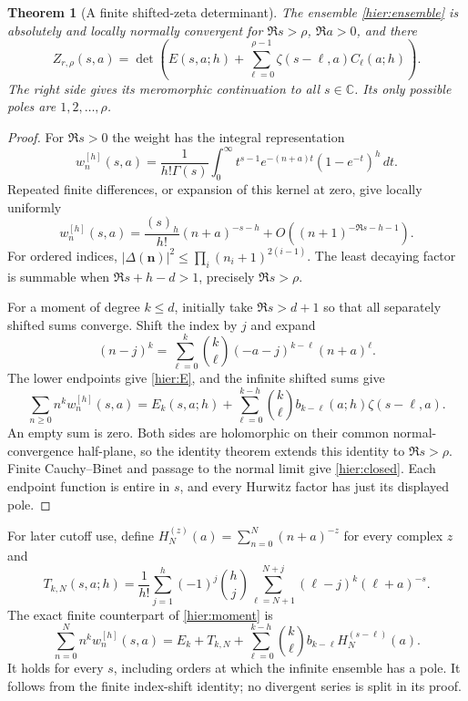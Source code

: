\documentclass[11pt]{article}
\newtheorem{theorem}{Theorem}[section]
\theoremstyle{definition}
\theoremstyle{remark}
\numberwithin{equation}{section}
\begin{document}
\begin{theorem}[A finite shifted-zeta determinant]
\label{hier:closure}
The ensemble \eqref{hier:ensemble} is absolutely and locally normally
convergent for $\Re s>\rho$, $\Re a>0$, and there
\begin{equation}\label{hier:closed}
 \boxed{\displaystyle
 Z_{r,\rho}(s,a)=\det\left(
 E(s,a;h)+\sum_{\ell=0}^{\rho-1}
                    \zeta(s-\ell,a)C_\ell(a;h)\right).}
\end{equation}
The right side gives its meromorphic continuation to all $s\in\mathbb C$.
Its only possible poles are $1,2,\ldots,\rho$.
\end{theorem}
\begin{proof}
For $\Re s>0$ the weight has the integral representation
\begin{equation}\label{hier:laplace}
 w_n^{[h]}(s,a)=\frac1{h!\Gamma(s)}
 \int_0^\infty t^{s-1}e^{-(n+a)t}(1-e^{-t})^h\,dt.
\end{equation}
Repeated finite differences, or expansion of this kernel at zero,
give locally uniformly
\begin{equation}\label{hier:decay}
 w_n^{[h]}(s,a)=\frac{(s)_h}{h!}(n+a)^{-s-h}
                     +O((n+1)^{-\Re s-h-1}).
\end{equation}
For ordered indices, $|\Delta(\boldsymbol n)|^2\le
\prod_i(n_i+1)^{2(i-1)}$.  The least decaying factor is summable
when $\Re s+h-d>1$, precisely $\Re s>\rho$.

For a moment of degree $k\le d$, initially take $\Re s>d+1$ so
that all separately shifted sums converge.  Shift the index by $j$
and expand
\[
 (n-j)^k=\sum_{\ell=0}^k\binom k\ell
                      (-a-j)^{k-\ell}(n+a)^\ell.
\]
The lower endpoints give \eqref{hier:E}, and the infinite shifted
sums give
\begin{equation}\label{hier:moment}
 \sum_{n\ge0}n^k w_n^{[h]}(s,a)
 =E_k(s,a;h)+\sum_{\ell=0}^{k-h}
     \binom k\ell b_{k-\ell}(a;h)\zeta(s-\ell,a).
\end{equation}
An empty sum is zero.  Both sides are holomorphic on their common
normal-convergence half-plane, so the identity theorem extends this
identity to $\Re s>\rho$.  Finite Cauchy--Binet and passage to the
normal limit give \eqref{hier:closed}.  Each endpoint function is
entire in $s$, and every Hurwitz factor has just its displayed pole.
\end{proof}

For later cutoff use, define
$H_N^{(z)}(a)=\sum_{n=0}^N(n+a)^{-z}$ for every complex $z$ and
\begin{equation}\label{hier:upper}
 T_{k,N}(s,a;h)=\frac1{h!}\sum_{j=1}^h(-1)^j\binom hj
       \sum_{\ell=N+1}^{N+j}(\ell-j)^k(\ell+a)^{-s}.
\end{equation}
The exact finite counterpart of \eqref{hier:moment} is
\begin{equation}\label{hier:finite-moment}
 \sum_{n=0}^N n^k w_n^{[h]}(s,a)
 = E_k+T_{k,N}+
   \sum_{\ell=0}^{k-h}\binom k\ell b_{k-\ell}
                                     H_N^{(s-\ell)}(a).
\end{equation}
It holds for every $s$, including orders at which the infinite
ensemble has a pole.  It follows from the finite index-shift identity;
no divergent series is split in its proof.
\end{document}
